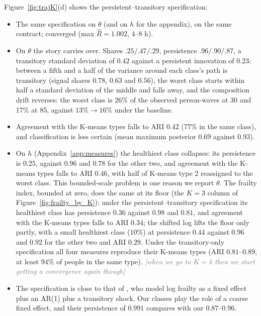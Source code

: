 \documentclass[11pt]{article}
\newcommand{\note}[1]{\textcolor{gray}{\textit{[#1]}}}
\begin{document}
	Figure~\ref{fig:trajK}(d) shows the persistent--transitory specification:
	\begin{itemize}
		\item The same specification on $\theta$ (and on $h$ for the appendix), on the same contract; converged (max $\hat R = 1.002$, 4--8 h).
		\item On $\theta$ the story carries over. Shares $.25/.47/.29$, persistence $.96/.90/.87$, a transitory standard deviation of $0.42$ against a persistent innovation of $0.23$: between a fifth and a half of the variance around each class's path is transitory (signal shares $0.78$, $0.63$ and $0.56$), the worst class starts within half a standard deviation of the middle and falls away, and the composition drift reverses: the worst class is 26\% of the observed person-waves at 30 and 17\% at 85, against $13\%\to16\%$ under the baseline.
		\item Agreement with the K-means types falls to ARI $0.42$ (77\% in the same class), and classification is less certain (mean maximum posterior $0.69$ against $0.93$).
		\item On $h$ (Appendix~\ref{app:measures}) the healthiest class collapses: its persistence is $0.25$, against $0.96$ and $0.78$ for the other two, and agreement with the K-means types falls to ARI $0.46$, with half of K-means type 2 reassigned to the worst class. This bounded-scale problem is one reason we report $\theta$. The frailty index, bounded at zero, does the same at its floor (the $K=3$ column of Figure~\ref{fig:frailty_by_K}): under the persistent--transitory specification its healthiest class has persistence $0.36$ against $0.98$ and $0.81$, and agreement with the K-means types falls to ARI $0.34$; the shifted log lifts the floor only partly, with a small healthiest class ($10\%$) at persistence $0.44$ against $0.96$ and $0.92$ for the other two and ARI $0.29$. Under the transitory-only specification all four measures reproduce their K-means types (ARI $0.81$--$0.89$, at least 94\% of people in the same type). \note{when we go to $K=4$ then we start getting a convergence again though}
		\item The specification is close to that of \citet{hosseini2022}, who model log frailty as a fixed effect plus an AR(1) plus a transitory shock. Our classes play the role of a coarse fixed effect, and their persistence of $0.991$ compares with our $0.87$--$0.96$.
	\end{itemize}
	
	
	
\end{document}
